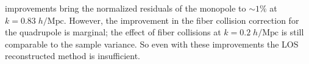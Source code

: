                                                                                                                                                                                                                                                                          improvements bring the normalized residuals of the monopole to $\sim 1\%$
                                                                                                                                                                                                                                                                         at $k = 0.83\;h/\mathrm{Mpc}$. However, the improvement in the fiber collision 
                                                                                                                                                                                                                                                                         correction for the quadrupole is marginal; the effect of fiber collisions 
                                                                                                                                                                                                                                                                         at $k = 0.2\;h/\mathrm{Mpc}$ is still comparable to the sample variance. So 
                                                                                                                                                                                                                                                                         even with these improvements the LOS reconstructed method is insufficient. 

